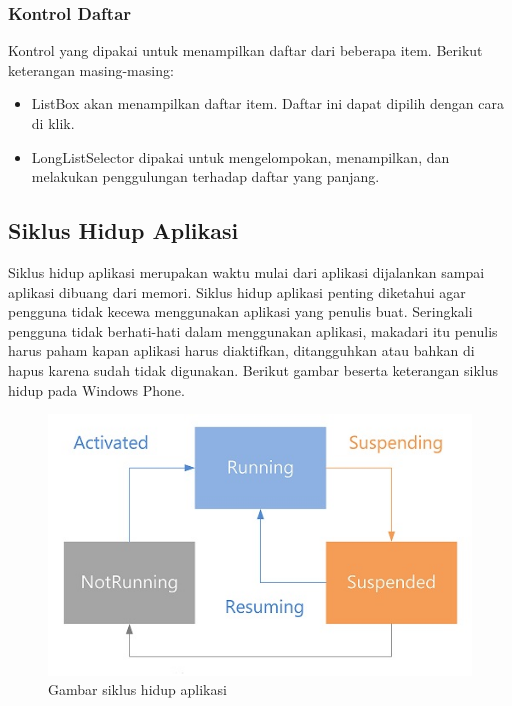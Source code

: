 \subsubsection{Kontrol Daftar}
\label{subsubsec:Kontrol Daftar}
\hspace{0.5cm} Kontrol yang dipakai untuk menampilkan daftar dari beberapa item. Berikut keterangan masing-masing:

\begin{itemize}
	\item ListBox akan menampilkan daftar item. Daftar ini dapat dipilih dengan cara di klik.
	\item LongListSelector dipakai untuk mengelompokan, menampilkan, dan melakukan penggulungan terhadap daftar yang panjang.
\end{itemize}

\subsection{Siklus Hidup Aplikasi}
\label{subsec:Siklus Hidup Aplikasi}
\hspace{0.5cm} Siklus hidup aplikasi merupakan waktu mulai dari aplikasi dijalankan sampai aplikasi dibuang dari memori. Siklus hidup aplikasi penting diketahui agar pengguna tidak kecewa menggunakan aplikasi yang penulis buat. Seringkali pengguna tidak berhati-hati dalam menggunakan aplikasi, makadari itu penulis harus paham kapan aplikasi harus diaktifkan, ditangguhkan atau bahkan di hapus karena sudah tidak digunakan. Berikut gambar beserta keterangan siklus hidup pada Windows Phone.

\begin{figure}[h]
	\centering
		\includegraphics[scale=0.7]{Gambar/lifecycle}
	\caption{Gambar siklus hidup aplikasi\cite{Manning}}
	\label{fig:Siklus Hidup Aplikasi}
\end{figure}


